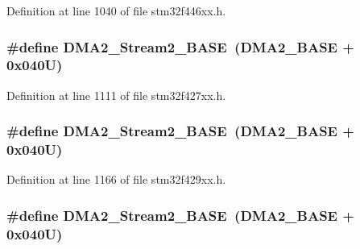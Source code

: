 Definition at line 1040 of file stm32f446xx.\+h.

\subsubsection[{\texorpdfstring{D\+M\+A2\+\_\+\+Stream2\+\_\+\+B\+A\+SE}{DMA2_Stream2_BASE}}]{\setlength{\rightskip}{0pt plus 5cm}\#define D\+M\+A2\+\_\+\+Stream2\+\_\+\+B\+A\+SE~({\bf D\+M\+A2\+\_\+\+B\+A\+SE} + 0x040\+U)}\hypertarget{group___peripheral__memory__map_gaed33a06f08188466f2ede06160984e9a}{}\label{group___peripheral__memory__map_gaed33a06f08188466f2ede06160984e9a}


Definition at line 1111 of file stm32f427xx.\+h.

\subsubsection[{\texorpdfstring{D\+M\+A2\+\_\+\+Stream2\+\_\+\+B\+A\+SE}{DMA2_Stream2_BASE}}]{\setlength{\rightskip}{0pt plus 5cm}\#define D\+M\+A2\+\_\+\+Stream2\+\_\+\+B\+A\+SE~({\bf D\+M\+A2\+\_\+\+B\+A\+SE} + 0x040\+U)}\hypertarget{group___peripheral__memory__map_gaed33a06f08188466f2ede06160984e9a}{}\label{group___peripheral__memory__map_gaed33a06f08188466f2ede06160984e9a}


Definition at line 1166 of file stm32f429xx.\+h.

\subsubsection[{\texorpdfstring{D\+M\+A2\+\_\+\+Stream2\+\_\+\+B\+A\+SE}{DMA2_Stream2_BASE}}]{\setlength{\rightskip}{0pt plus 5cm}\#define D\+M\+A2\+\_\+\+Stream2\+\_\+\+B\+A\+SE~({\bf D\+M\+A2\+\_\+\+B\+A\+SE} + 0x040\+U)}\hypertarget{group___peripheral__memory__map_gaed33a06f08188466f2ede06160984e9a}{}\label{group___peripheral__memory__map_gaed33a06f08188466f2ede06160984e9a}


